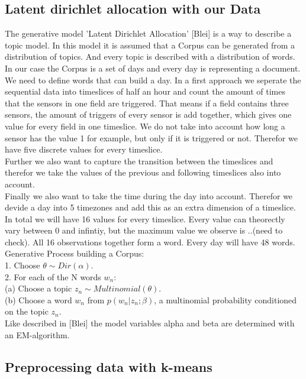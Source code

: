 \documentclass[11pt,a4paper]{article}
\begin{document}
\subsection{Latent dirichlet allocation with our Data}
The generative model 'Latent Dirichlet Allocation' [Blei] is a way to describe a topic model. In this model it is assumed that a Corpus can be generated from a distribution of topics. And every topic is described with a distribution of words.
In our case the Corpus is a set of days and every day is representing a document. We need to define words that can build a day. In a first approach we seperate the sequential data into timeslices of half an hour and count the amount of times that the sensors in one field are triggered. 
That means if a field contains three sensors, the amount of triggers of every sensor is add together, which gives one value for every field in one timeslice.
We do not take into account how long a sensor has the value 1 for example, but only if it is triggered or not. Therefor we have five discrete values for every timeslice.\\
Further we also want to capture the transition between the timeslices and therefor we take the values of the previous and following timeslices also into account.\\
Finally we also want to take the time during the day into account. Therefor we devide a day into 5 timezones and add this as an extra dimension of a timeslice.\\
In total we will have 16 values for every timeslice. Every value can theorectly vary between 0 and infintiy, but the maximum value we observe is ..(need to check). All 16 observations together form a word. Every day will have 48 words.\\

Generative Process building a Corpus:\\
1. Choose $\theta \sim Dir(\alpha)$.\\
2. For each of the N words $w_n$:\\
(a) Choose a topic $z_n \sim Multinomial(\theta)$.\\
(b)	Choose a word $w_n$ from $p(w_n |z_n;\beta)$, a multinomial probability conditioned on the topic
$z_n$.\\
Like described in [Blei] the model variables alpha and beta are determined with an EM-algorithm.




\subsection{Preprocessing data with k-means}
\end{document}
